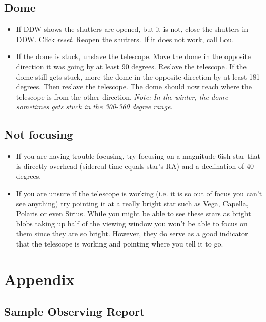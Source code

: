 \documentclass[11pt]{report}
\begin{document}
\section{Dome}
\begin{itemize}
\item If DDW shows the shutters are opened, but it is not, close the shutters in DDW. Click \emph{reset}. Reopen the shutters. If it does not work, call Lou.
\item If the dome is stuck, unslave the telescope. Move the dome in the opposite direction it was going by at least 90 degrees. Reslave the telescope. If the dome still gets stuck, more the dome in the opposite direction by at least 181 degrees. Then reslave the telescope. The dome should now reach where the telescope is from the other direction. \emph{Note: In the winter, the dome sometimes gets stuck in the 300-360 degree range.}
\end{itemize}

\section{Not focusing}
\begin{itemize}
\item If you are having trouble focusing, try focusing on a magnitude 6ish star that is directly overhead (sidereal time equals star's RA) and a declination of 40 degrees.
\item If you are unsure if the telescope is working (i.e. it is so out of focus you can't see anything) try pointing it at a really bright star such as Vega, Capella, Polaris or even Sirius. While you might be able to see these stars as bright blobs taking up half of the viewing window you won't be able to focus on them since they are so bright. However, they do serve as a good indicator that the telescope is working and pointing where you tell it to go.
\end{itemize}


\chapter{Appendix}

\section{Sample Observing Report}
\end{document}
